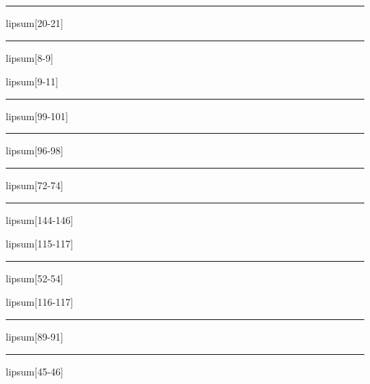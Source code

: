 \documentclass[11pt,a4paper]{article}
\begin{document}
\begin{simplewrap}
  \textcolor{lime!49}{\rule{6.0cm}{4.2cm}}
\end{simplewrap}
lipsum[20-21]

\begin{simplewrap}
  \textcolor{pink!33}{\rule{4.5cm}{8.0cm}}
\end{simplewrap}
lipsum[8-9]

lipsum[9-11]

\begin{simplewrap}
  \textcolor{purple!14}{\rule{3.7cm}{7.2cm}}
\end{simplewrap}
lipsum[99-101]

\begin{simplewrap}
  \textcolor{blue!48}{\rule{3.5cm}{5.6cm}}
\end{simplewrap}
lipsum[96-98]

\begin{simplewrap}
  \textcolor{green!46}{\rule{3.4cm}{4.9cm}}
\end{simplewrap}
lipsum[72-74]

\begin{simplewrap}
  \textcolor{orange!11}{\rule{5.2cm}{6.0cm}}
\end{simplewrap}
lipsum[144-146]

lipsum[115-117]

\begin{simplewrap}
  \textcolor{yellow!49}{\rule{3.9cm}{9.3cm}}
\end{simplewrap}
lipsum[52-54]

lipsum[116-117]

\begin{simplewrap}
  \textcolor{cyan!55}{\rule{4.3cm}{2.7cm}}
\end{simplewrap}
lipsum[89-91]

\begin{simplewrap}
  \textcolor{magenta!44}{\rule{3.9cm}{4.4cm}}
\end{simplewrap}
lipsum[45-46]
\end{document}
